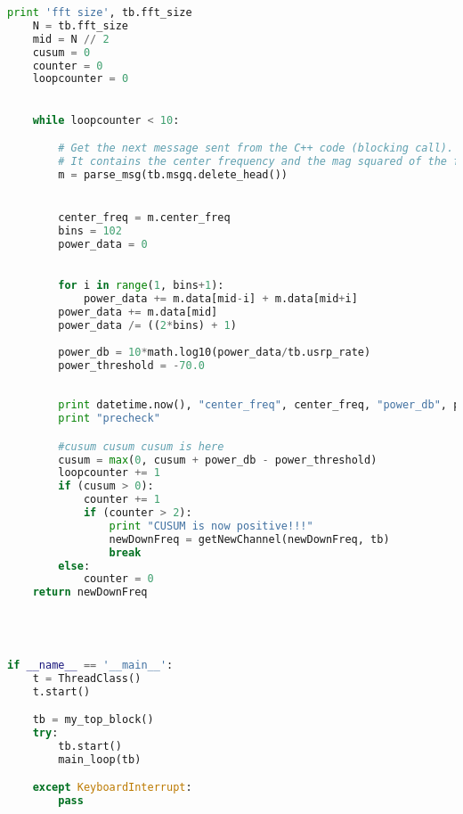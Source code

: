\begin{lstlisting}[language=Python]
    print 'fft size', tb.fft_size
    N = tb.fft_size
    mid = N // 2
    cusum = 0
    counter = 0
    loopcounter = 0
    

    while loopcounter < 10:

        # Get the next message sent from the C++ code (blocking call).
        # It contains the center frequency and the mag squared of the fft
        m = parse_msg(tb.msgq.delete_head())


        center_freq = m.center_freq
        bins = 102
        power_data = 0

        
        for i in range(1, bins+1):
            power_data += m.data[mid-i] + m.data[mid+i]
        power_data += m.data[mid]
        power_data /= ((2*bins) + 1)
        
        power_db = 10*math.log10(power_data/tb.usrp_rate)
        power_threshold = -70.0
        
        
        print datetime.now(), "center_freq", center_freq, "power_db", power_db
        print "precheck"

        #cusum cusum cusum is here
        cusum = max(0, cusum + power_db - power_threshold)
        loopcounter += 1
        if (cusum > 0):
            counter += 1
            if (counter > 2):
                print "CUSUM is now positive!!!"
                newDownFreq = getNewChannel(newDownFreq, tb)
                break
        else:
            counter = 0
    return newDownFreq




if __name__ == '__main__':
    t = ThreadClass()
    t.start()

    tb = my_top_block()
    try:
        tb.start()
        main_loop(tb)

    except KeyboardInterrupt:
        pass


\end{lstlisting}




